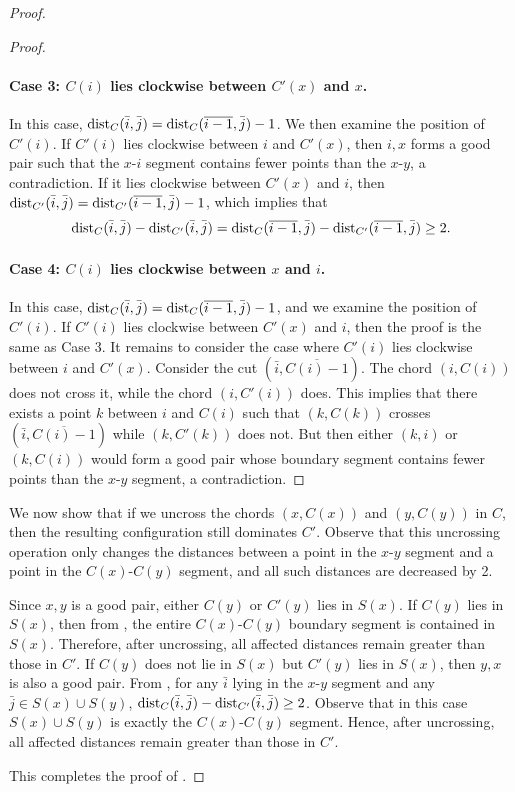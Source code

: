 \documentclass[11pt]{article}
\newcommand{\dist}{\textnormal{dist}}
\begin{document}
\begin{proof}
\begin{proof}
\paragraph{Case 3: $C(i)$ lies clockwise between $C'(x)$ and $x$.} In this case, $\dist_C(\bar i,\bar j)=\dist_C(\overline{i-1},\bar j)-1$. We then examine the position of $C'(i)$. If $C'(i)$ lies clockwise between $i$ and $C'(x)$, then $i,x$ forms a good pair such that the $x$-$i$ segment contains fewer points than the $x$-$y$, a contradiction.
If it lies clockwise between $C'(x)$ and $i$, then $\dist_{C'}(\bar i,\bar j)=\dist_{C'}(\overline{i-1},\bar j)-1$, which implies that
        \[
            \dist_C(\bar i,\bar j)-\dist_{C'}(\bar i,\bar j) = \dist_C(\overline{i-1},\bar j)-\dist_{C'}(\overline{i-1},\bar j)\ge 2.
        \]
        
\paragraph{Case 4: $C(i)$ lies clockwise between $x$ and $i$.} In this case, $\dist_C(\bar i,\bar j)=\dist_C(\overline{i-1},\bar j)-1$, and we examine the position of $C'(i)$. If $C'(i)$ lies clockwise between $C'(x)$ and $i$, then the proof is the same as Case 3. It remains to consider the case where $C'(i)$ lies clockwise between $i$ and $C'(x)$. Consider the cut $(\bar i,\overline{C(i)-1})$. The chord $(i,C(i))$ does not cross it, while the chord $(i,C'(i))$ does. This implies that there exists a point $k$ between $i$ and $C(i)$ such that $(k,C(k))$ crosses $(\bar i,\overline{C(i)-1})$ while $(k,C'(k))$ does not. But then either $(k,i)$ or $(k,C(i))$ would form a good pair whose boundary segment contains fewer points than the $x$-$y$ segment, a contradiction.
\end{proof}

We now show that if we uncross the chords $(x, C(x))$ and $(y, C(y))$ in $C$, then the resulting configuration still dominates $C'$. Observe that this uncrossing operation only changes the distances between a point in the  $x$-$y$ segment and a point in the $C(x)$-$ C(y)$ segment, and all such distances are decreased by 2.
    
Since $x,y$ is a good pair, either $C(y)$ or $C'(y)$ lies in $S(x)$. If $C(y)$ lies in $S(x)$, then from , the entire $C(x)$-$C(y)$  boundary segment is contained in $S(x)$. Therefore, after uncrossing, all affected distances remain greater than those in $C'$. 
%
If $C(y)$ does not lie in $S(x)$ but $C'(y)$ lies in $S(x)$, then $y,x$ is also a good pair. From , for any $\bar i$ lying in the $x$-$y$ segment and any $\bar j \in S(x)\cup S(y)$, $\dist_C(\bar i,\bar j)-\dist_{C'}(\bar i,\bar j) \ge 2$. Observe that in this case $S(x) \cup S(y)$ is exactly the $C(x)$-$C(y)$ segment. Hence, after uncrossing, all affected distances remain greater than those in $C'$. 
    
This completes the proof of .
\end{proof}
\end{document}
